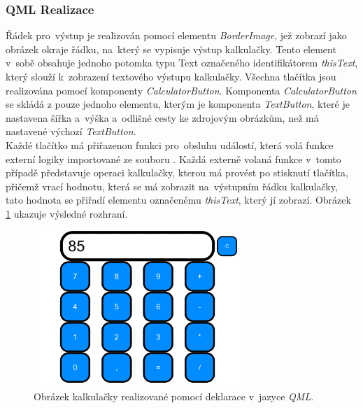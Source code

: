 \documentclass[11pt,twoside,a4paper]{book}
\begin{document}
\subsubsection{QML Realizace}
Řádek pro~výstup je realizován pomocí elementu \textit{BorderImage}, jež zobrazí jako obrázek okraje řádku, na~který se vypisuje výstup kalkulačky. Tento element v~sobě obsahuje jednoho potomka typu Text označeného identifikátorem \textit{thisText}, který slouží k~zobrazení textového výstupu kalkulačky.
Všechna tlačítka jsou realizována pomocí komponenty \textit{CalculatorButton}.  Komponenta \textit{CalculatorButton} se skládá z pouze jednoho elementu, kterým je komponenta \textit{TextButton}, které je nastavena šířka a~výška a~odlišné cesty ke zdrojovým obrázkům, než má nastavené výchozí \textit{TextButton}.\\ Každé tlačítko má přiřazenou funkci pro~obsluhu událostí, která volá funkce externí logiky importované ze souboru . Každá externě volaná funkce v~tomto případě představuje operaci kalkulačky, kterou má provést po stisknutí tlačítka, přičemž vrací hodnotu, která se má zobrazit na~výstupním řádku kalkulačky, tato hodnota se přiřadí elementu označenému \textit{thisText}, který jí zobrazí. Obrázek \ref{fig:outCalcQML} ukazuje výsledné rozhraní.
\begin{figure}[!ht]
\begin{center}
  \includegraphics[width=0.7\textwidth]{qmlCalc}
\caption{{\label{fig:outCalcQML}}Obrázek kalkulačky realizované pomocí deklarace v~jazyce \textit{QML}.}
\end{center}
\end{figure}
\end{document}
